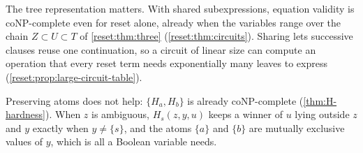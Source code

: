 The tree representation matters. With shared subexpressions, equation validity is coNP-complete even for
reset alone, already when the variables range over the chain
$Z\subset U\subset T$ of \cref{reset:thm:three} (\cref{reset:thm:circuits}). Sharing lets successive clauses reuse one
continuation, so a circuit of linear size can compute an operation
that every reset term needs exponentially many leaves to express
(\cref{reset:prop:large-circuit-table}).

Preserving atoms does not help: $\{H_a,H_b\}$ is already coNP-complete (\cref{thm:H-hardness}). When $z$ is ambiguous, $H_s(z,y,u)$ keeps a winner of $u$ lying outside $z$ and $y$ exactly when $y\ne\{s\}$, and the atoms $\{a\}$ and $\{b\}$ are mutually exclusive values of $y$, which is all a Boolean variable needs.
